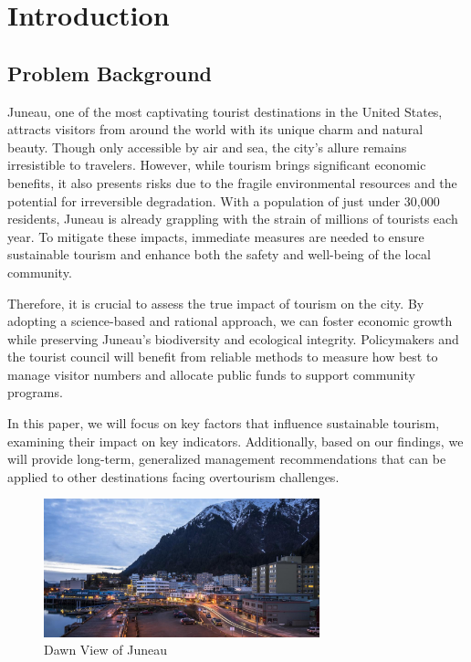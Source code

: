 \documentclass[UTF8]{mcmthesis}
\begin{document}
    \maketitle
    \tableofcontents

    \setcounter{page}{1}
    \section{Introduction}
        \subsection{Problem Background}
            \hspace*{2em}Juneau, one of the most captivating tourist destinations in the United States, attracts visitors from around the world with its unique charm and natural beauty. Though only accessible by air and sea, the city’s allure remains irresistible to travelers.
            However, while tourism brings significant economic benefits, it also presents risks due to the fragile environmental resources and the potential for irreversible degradation. With a population of just under 30,000 residents, Juneau is already grappling with the strain of millions of tourists each year. To mitigate these impacts, immediate measures are needed to ensure sustainable tourism and enhance both the safety and well-being of the local community.
            
            Therefore, it is crucial to assess the true impact of tourism on the city. By adopting a science-based and rational approach, we can foster economic growth while preserving Juneau’s biodiversity and ecological integrity. Policymakers and the tourist council will benefit from reliable methods to measure how best to manage visitor numbers and allocate public funds to support community programs.
            
            In this paper, we will focus on key factors that influence sustainable tourism, examining their impact on key indicators. Additionally, based on our findings, we will provide long-term, generalized management recommendations that can be applied to other destinations facing overtourism challenges.

            \begin{figure}[htbp]
                \centering
                \includegraphics[width=8cm]{figure1.png}
                \caption{Dawn View of Juneau}
            \end{figure}
        
\end{document}
